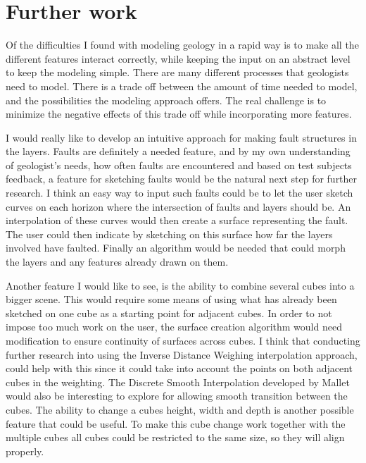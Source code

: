 \documentclass[a4paper,12pt]{report}
\begin{document}


\clearpage
\chapter{Further work}
\label{sec:further}
Of the difficulties I found with modeling geology in a rapid way is to make all the different features interact correctly, while keeping the input on an abstract level to keep the modeling simple. There are many different processes that geologists need to model. There is a trade off between the amount of time needed to model, and the possibilities the modeling approach offers. The real challenge is to minimize the negative effects of this trade off while incorporating more features.

I would really like to develop an intuitive approach for making fault structures in the layers. Faults are definitely a needed feature, and by my own understanding of geologist's needs, how often faults are encountered and based on test subjects feedback, a feature for sketching faults would be the natural next step for further research. I think an easy way to input such faults could be to let the user sketch curves on each horizon where the intersection of faults and layers should be. An interpolation of these curves would then create a surface representing the fault. The user could then indicate by sketching on this surface how far the layers involved have faulted. Finally an algorithm would be needed that could morph the layers and any features already drawn on them.

Another feature I would like to see, is the ability to combine several cubes into a bigger scene. This would require some means of using what has already been sketched on one cube as a starting point for adjacent cubes. In order to not impose too much work on the user, the surface creation algorithm would need modification to ensure continuity of surfaces across cubes. I think that conducting further research into using the Inverse Distance Weighing interpolation approach, could help with this since it could take into account the points on both adjacent cubes in the weighting. The Discrete Smooth Interpolation developed by Mallet \cite{mallet1992gocad} would also be interesting to explore for allowing smooth transition between the cubes. The ability to change a cubes height, width and depth is another possible feature that could be useful. To make this cube change work together with the multiple cubes all cubes could be restricted to the same size, so they will align properly.
\end{document}
